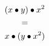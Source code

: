 \documentclass{article}
\begin{document}
\thispagestyle{empty}
\pagecolor{mycol}
\begin{gather*}
  (x\bullet y)\bullet x^2\\
\smash{=}\\
  x\bullet(y\bullet x^2)
\end{gather*}
\end{document}
